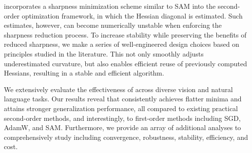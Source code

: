 \sassha incorporates a sharpness minimization scheme similar to SAM \citep{sam} into the second-order optimization framework, in which the Hessian diagonal is estimated.
Such estimates, however, can become numerically unstable when enforcing the sharpness reduction process.
To increase stability while preserving the benefits of reduced sharpness, we make a series of well-engineered design choices based on principles studied in the literature.
This not only smoothly adjusts underestimated curvature, but also enables efficient reuse of previously computed Hessians, resulting in a stable and efficient algorithm.

We extensively evaluate the effectiveness of \sassha across diverse vision and natural language tasks.
Our results reveal that \sassha consistently achieves flatter minima and attains stronger generalization performance, all compared to existing practical second-order methods, and interestingly, to first-order methods including SGD, AdamW, and SAM.
Furthermore, we provide an array of additional analyses to comprehensively study \sassha including convergence, robustness, stability, efficiency, and cost.

